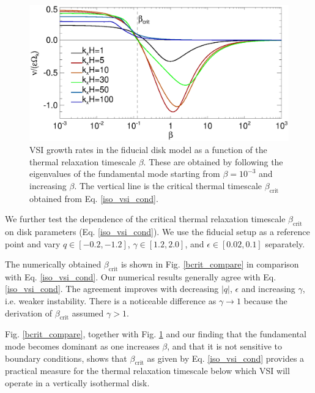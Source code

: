 \begin{figure}
   \includegraphics[width=\linewidth]{figures/gcorr_compare2} 
   \caption{VSI growth rates in the fiducial disk
     model as a function of the thermal relaxation timescale
     $\beta$. These are obtained by following the eigenvalues of the
     fundamental mode starting from $\beta=10^{-3}$ and increasing
     $\beta$. The vertical line is the
     critical thermal timescale $\beta_\mathrm{crit}$ obtained  
     from Eq. \ref{iso_vsi_cond}. 
     \label{bcrit_compare1}}   
 \end{figure} 
 
 We further test the dependence of the critical thermal relaxation timescale 
 $\beta_\mathrm{crit}$ on disk parameters (Eq. \ref{iso_vsi_cond}).
 We use the fiducial setup as a  reference point and vary
 $q\in[-0.2,-1.2]$,  $\gamma\in[1.2,2.0]$, and $\epsilon\in[0.02,0.1]$ 
 separately.

 The numerically obtained $\beta_\mathrm{crit}$ is shown in
 Fig. \ref{bcrit_compare} in comparison with Eq. \ref{iso_vsi_cond}.
 Our numerical results generally agree with Eq. \ref{iso_vsi_cond}. The
 agreement improves with decreasing  $|q|$,  $\epsilon$ and increasing
 $\gamma$, i.e. weaker instability. There is a noticeable difference
 as $\gamma\to1$ because the derivation of $\beta_\mathrm{crit}$
 assumed $\gamma>1$.   
 
 Fig. \ref{bcrit_compare}, together with Fig. \ref{bcrit_compare1} and 
 our finding that the fundamental mode becomes dominant as one
 increases $\beta$, and that it is not sensitive to boundary
 conditions, shows that $\beta_\mathrm{crit}$ as given  by
 Eq. \ref{iso_vsi_cond} provides a practical measure for the thermal
 relaxation timescale below which  VSI will operate in a vertically
 isothermal disk. 

